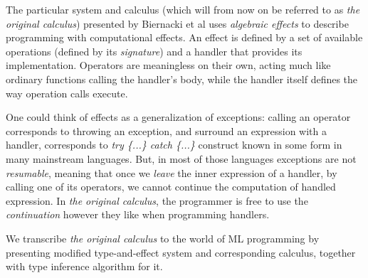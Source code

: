 \documentclass[declaration,shortabstract]{iithesis}
\theoremstyle{definition} \newtheorem{definition}{Definition}[section]
\begin{document}
The particular system and calculus (which will from now on be referred to as \textit{the original calculus}) presented by Biernacki et al\cite{binders-labels}
uses \textit{algebraic effects} to describe programming with computational effects.
An effect is defined by a set of available operations (defined by its \textit{signature})
and a handler that provides its implementation.
Operators are meaningless on their own, acting much like ordinary functions
calling the handler's body, while the handler itself defines the way operation calls execute.

One could think of effects as a generalization of exceptions:
calling an operator corresponds to throwing an exception,
and surround an expression with a handler, corresponds to \textit{try \{...\} catch \{...\}}
construct known in some form in many mainstream languages.
But, in most of those languages exceptions are not \textit{resumable},
meaning that once we \textit{leave} the inner expression of a handler,
by calling one of its operators, we cannot continue the computation of
handled expression.
In \textit{the original calculus}, the programmer is free
to use the \textit{continuation} however they like when programming handlers.

We transcribe \textit{the original calculus} to the world of ML programming
by presenting modified type-and-effect system and corresponding calculus,
together with type inference algorithm for it.

\end{document}
